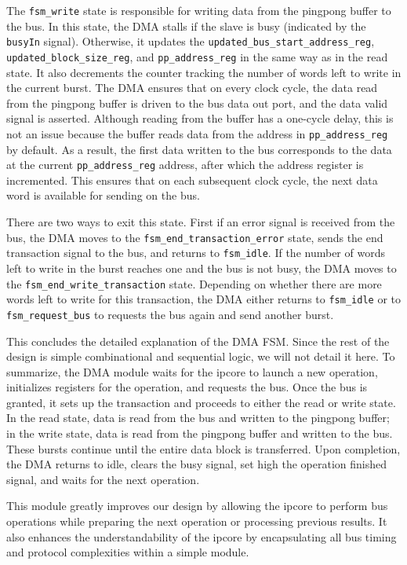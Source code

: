 \documentclass[a4paper,11pt,oneside]{report}
\begin{document}
The \texttt{fsm\_write} state is responsible for writing data from the pingpong buffer to the bus.  
In this state, the DMA stalls if the slave is busy (indicated by the \texttt{busyIn} signal).  
Otherwise, it updates the \texttt{updated\_bus\_start\_address\_reg}, \texttt{updated\_block\_size\_reg}, and \texttt{pp\_address\_reg} in the same way as in the read state.  
It also decrements the counter tracking the number of words left to write in the current burst.  
The DMA ensures that on every clock cycle, the data read from the pingpong buffer is driven to the bus data out port, and the data valid signal is asserted.  
Although reading from the buffer has a one-cycle delay, this is not an issue because the buffer reads data from the address in \texttt{pp\_address\_reg} by default.  
As a result, the first data written to the bus corresponds to the data at the current \texttt{pp\_address\_reg} address, after which the address register is incremented. 
This ensures that on each subsequent clock cycle, the next data word is available for sending on the bus.

There are two ways to exit this state.  
First if an error signal is received from the bus, the DMA moves to the \texttt{fsm\_end\_transaction\_error} state, sends the end transaction signal to the bus, and returns to \texttt{fsm\_idle}.  
If the number of words left to write in the burst reaches one and the bus is not busy, the DMA moves to the \texttt{fsm\_end\_write\_transaction} state.  
Depending on whether there are more words left to write for this transaction, the DMA either returns to \texttt{fsm\_idle} or to \texttt{fsm\_request\_bus} to requests the bus again and send another burst.

This concludes the detailed explanation of the DMA FSM.  
Since the rest of the design is simple combinational and sequential logic, we will not detail it here.  
To summarize, the DMA module waits for the ipcore to launch a new operation, initializes registers for the operation, and requests the bus.  
Once the bus is granted, it sets up the transaction and proceeds to either the read or write state.  
In the read state, data is read from the bus and written to the pingpong buffer;  
in the write state, data is read from the pingpong buffer and written to the bus.  
These bursts continue until the entire data block is transferred.  
Upon completion, the DMA returns to idle, clears the busy signal, set high the operation finished signal, and waits for the next operation.

This module greatly improves our design by allowing the ipcore to perform bus operations while preparing the next operation or processing previous results.  
It also enhances the understandability of the ipcore by encapsulating all bus timing and protocol complexities within a simple module.
\end{document}
